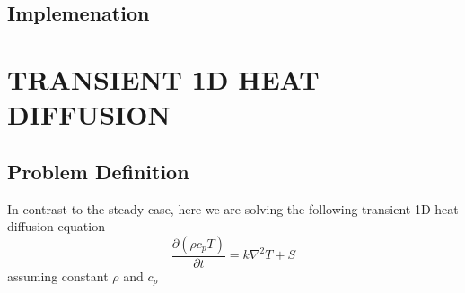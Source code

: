\documentclass[11pt]{article}
\begin{document}
\subsection{Implemenation}
\label{sec:orgd5bb728}

\section{TRANSIENT 1D HEAT DIFFUSION}
\label{sec:orga7ab6bc}
\subsection{Problem Definition}
\label{sec:org1ea3abe}
In contrast to the steady case, here we are solving the following transient 1D heat diffusion equation
\begin{equation}
\frac{\partial (\rho c_p T)}{\partial t} = k \nabla^2 T + S
\end{equation}
assuming constant \(\rho\) and \(c_p\)
\end{document}

